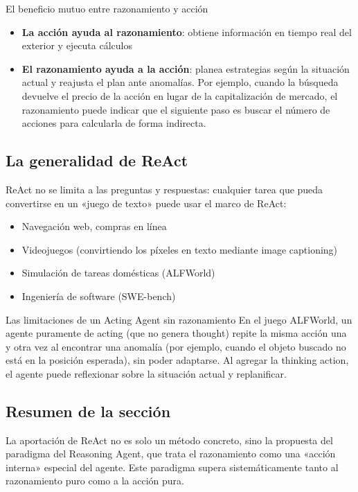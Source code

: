 \begin{knowledgebox}{El beneficio mutuo entre razonamiento y acción}
\begin{itemize}
    \item \textbf{La acción ayuda al razonamiento}: obtiene información en tiempo real del exterior y ejecuta cálculos
    \item \textbf{El razonamiento ayuda a la acción}: planea estrategias según la situación actual y reajusta el plan ante anomalías. Por ejemplo, cuando la búsqueda devuelve el precio de la acción en lugar de la capitalización de mercado, el razonamiento puede indicar que el siguiente paso es buscar el número de acciones para calcularla de forma indirecta.
\end{itemize}
\end{knowledgebox}

\subsection{La generalidad de ReAct}

ReAct no se limita a las preguntas y respuestas: cualquier tarea que pueda convertirse en un «juego de texto» puede usar el marco de ReAct:

\begin{itemize}
    \item Navegación web, compras en línea
    \item Videojuegos (convirtiendo los píxeles en texto mediante image captioning)
    \item Simulación de tareas domésticas (ALFWorld)
    \item Ingeniería de software (SWE-bench)
\end{itemize}

\begin{warningbox}{Las limitaciones de un Acting Agent sin razonamiento}
En el juego ALFWorld, un agente puramente de acting (que no genera thought) repite la misma acción una y otra vez al encontrar una anomalía (por ejemplo, cuando el objeto buscado no está en la posición esperada), sin poder adaptarse. Al agregar la thinking action, el agente puede reflexionar sobre la situación actual y replanificar.
\end{warningbox}

\subsection{Resumen de la sección}

La aportación de ReAct no es solo un método concreto, sino la propuesta del paradigma del Reasoning Agent, que trata el razonamiento como una «acción interna» especial del agente. Este paradigma supera sistemáticamente tanto al razonamiento puro como a la acción pura.

